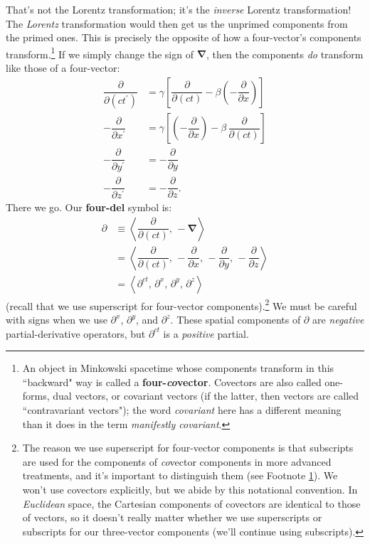 \documentclass[12pt]{article}
\newcommand{\del}{\boldsymbol{\nabla}}
\begin{document}
That's not the Lorentz transformation; it's the \emph{inverse} Lorentz transformation! The \emph{Lorentz} transformation would then get us the unprimed components from the primed ones. This is precisely the opposite of how a four-vector's components transform.\footnote{\label{fn:cv}An object in Minkowski spacetime whose components transform in this ``backward" way is called a \textbf{four-\emph{co}vector}. Covectors are also called one-forms, dual vectors, or covariant vectors (if the latter, then vectors are called ``contravariant vectors"); the word \emph{covariant} here has a different meaning than it does in the term \emph{manifestly covariant}.} If we simply change the sign of $\del$, then the components \emph{do} transform like those of a four-vector:
\begin{equation*}
\begin{split}
\dfrac{\partial}{\partial (ct^\prime)} &= \gamma \left[ \dfrac{\partial}{\partial (ct)} - \beta \left(- \dfrac{\partial}{\partial x} \right) \right] \\[3pt]
- \dfrac{\partial}{\partial x^\prime} &= \gamma \left[ \left( - \dfrac{\partial}{\partial x} \right) - \beta \, \dfrac{\partial}{\partial (ct)}  \right] \\[3pt]
- \dfrac{\partial}{\partial y^\prime} &= - \dfrac{\partial}{\partial y} \\[3pt]
- \dfrac{\partial}{\partial z^\prime} &= - \dfrac{\partial}{\partial z} .
\end{split}
\end{equation*}
There we go. Our \textbf{four-del} symbol is:
\begin{equation}\label{eq:fn}
\boxed{
\begin{aligned}
\partialup &\equiv \left \langle \dfrac{\partial}{\partial (ct)} , \, - \del \right \rangle \\[3pt]
&= \left \langle \dfrac{\partial}{\partial (ct)} , \, - \dfrac{\partial}{\partial x}, \, - \dfrac{\partial}{\partial y}, \, - \dfrac{\partial}{\partial z} \right \rangle \\[3pt]
&=  \left \langle \partial^{ct}, \, \partial^x , \, \partial^y , \, \partial^z \right \rangle
\end{aligned}
}
\end{equation}
(recall that we use superscript for four-vector components).\footnote{The reason we use superscript for four-vector components is that subscripts are used for the components of \emph{co}vector components in more advanced treatments, and it's important to distinguish them (see Footnote \ref{fn:cv}). We won't use covectors explicitly, but we abide by this notational convention. In \emph{Euclidean} space, the Cartesian components of covectors are identical to those of vectors, so it doesn't really matter whether we use superscripts or subscripts for our three-vector components (we'll continue using subscripts).} We must be careful with signs when we use $\partial^x$, $\partial^y$, and $\partial^z$. These spatial components of $\partialup$ are \emph{negative} partial-derivative operators, but $\partial^{ct}$ is a \emph{positive} partial.
\end{document}
